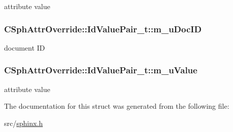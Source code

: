 attribute value 

\hypertarget{structCSphAttrOverride_1_1IdValuePair__t_a2070eaff526d4adb8fa0fdd569c78c61}{
\subsubsection[{m\-\_\-u\-Doc\-I\-D}]{ C\-Sph\-Attr\-Override\-::\-Id\-Value\-Pair\-\_\-t\-::m\-\_\-u\-Doc\-I\-D}}\label{structCSphAttrOverride_1_1IdValuePair__t_a2070eaff526d4adb8fa0fdd569c78c61}


document I\-D 

\hypertarget{structCSphAttrOverride_1_1IdValuePair__t_a580d5a4db4739242dcc2c8bba2c09f8e}{
\subsubsection[{m\-\_\-u\-Value}]{ C\-Sph\-Attr\-Override\-::\-Id\-Value\-Pair\-\_\-t\-::m\-\_\-u\-Value}}\label{structCSphAttrOverride_1_1IdValuePair__t_a580d5a4db4739242dcc2c8bba2c09f8e}


attribute value 



The documentation for this struct was generated from the following file\-:\begin{DoxyCompactItemize}
\item 
src/\hyperlink{sphinx_8h}{sphinx.\-h}\end{DoxyCompactItemize}
